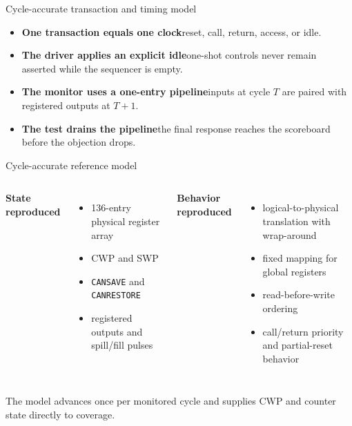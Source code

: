 \documentclass[aspectratio=169,11pt]{beamer}
\newcommand{\code}[1]{\texttt{#1}}
\newcommand{\key}[1]{{\color{teal}\bfseries #1}}
\begin{document}
\begin{frame}{Cycle-accurate transaction and timing model}
\begin{itemize}
  \item \key{One transaction equals one clock}\quad reset, call, return, access, or idle.
  \vspace{0.45em}
  \item \key{The driver applies an explicit idle}\quad one-shot controls never remain asserted while the sequencer is empty.
  \vspace{0.45em}
  \item \key{The monitor uses a one-entry pipeline}\quad inputs at cycle \(T\) are paired with registered outputs at \(T+1\).
  \vspace{0.45em}
  \item \key{The test drains the pipeline}\quad the final response reaches the scoreboard before the objection drops.
\end{itemize}
\end{frame}

\begin{frame}{Cycle-accurate reference model}
\begin{columns}[T,onlytextwidth]
\key{State reproduced}\par\vspace{0.35em}
\begin{itemize}
  \item 136-entry physical register array
  \item CWP and SWP
  \item \code{CANSAVE} and \code{CANRESTORE}
  \item registered outputs and spill/fill pulses
\end{itemize}
\key{Behavior reproduced}\par\vspace{0.35em}
\begin{itemize}
  \item logical-to-physical translation with wrap-around
  \item fixed mapping for global registers
  \item read-before-write ordering
  \item call/return priority and partial-reset behavior
\end{itemize}
\end{columns}
\vspace{0.65em}
\centering
The model advances once per monitored cycle and supplies CWP and counter state directly to coverage.
\end{frame}
\end{document}
